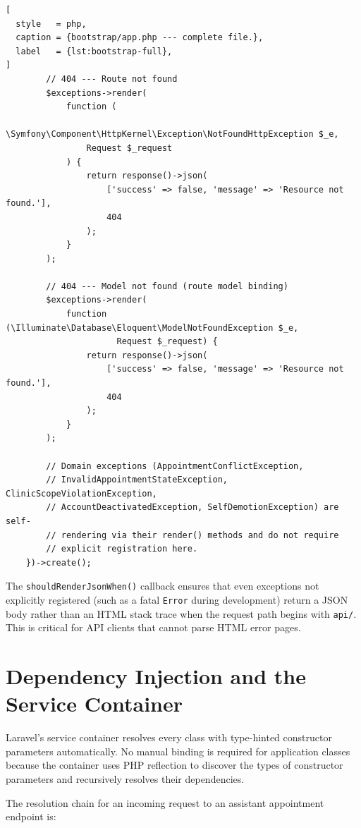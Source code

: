 \begin{lstlisting}[
  style   = php,
  caption = {bootstrap/app.php --- complete file.},
  label   = {lst:bootstrap-full},
]
        // 404 --- Route not found
        $exceptions->render(
            function (
                \Symfony\Component\HttpKernel\Exception\NotFoundHttpException $_e,
                Request $_request
            ) {
                return response()->json(
                    ['success' => false, 'message' => 'Resource not found.'],
                    404
                );
            }
        );

        // 404 --- Model not found (route model binding)
        $exceptions->render(
            function (\Illuminate\Database\Eloquent\ModelNotFoundException $_e,
                      Request $_request) {
                return response()->json(
                    ['success' => false, 'message' => 'Resource not found.'],
                    404
                );
            }
        );

        // Domain exceptions (AppointmentConflictException,
        // InvalidAppointmentStateException, ClinicScopeViolationException,
        // AccountDeactivatedException, SelfDemotionException) are self-
        // rendering via their render() methods and do not require
        // explicit registration here.
    })->create();
\end{lstlisting}

The \texttt{shouldRenderJsonWhen()} callback ensures that even exceptions
not explicitly registered (such as a fatal \texttt{Error} during
development) return a JSON body rather than an HTML stack trace when the
request path begins with \texttt{api/}. This is critical for API clients
that cannot parse HTML error pages.

\section{Dependency Injection and the Service Container}
\label{sec:di-container}

Laravel's service container resolves every class with type-hinted
constructor parameters automatically. No manual binding is required for
application classes because the container uses PHP reflection to
discover the types of constructor parameters and recursively resolves
their dependencies.

The resolution chain for an incoming request to an assistant appointment
endpoint is:

